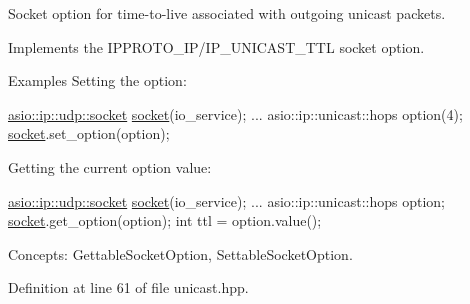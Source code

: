 Socket option for time-\/to-\/live associated with outgoing unicast packets. 

Implements the I\+P\+P\+R\+O\+T\+O\+\_\+\+I\+P/\+I\+P\+\_\+\+U\+N\+I\+C\+A\+S\+T\+\_\+\+T\+T\+L socket option.

\begin{DoxyParagraph}{Examples}
Setting the option\+: 
\begin{DoxyCode}
\hyperlink{classasio_1_1basic__datagram__socket}{asio::ip::udp::socket} \hyperlink{namespacewebsocketpp_1_1transport_1_1asio_1_1socket_1_1error_a828ddaa5ed63a761e1b557465a35f05aa0c31b356014843e1d09514e794a539a7}{socket}(io\_service); 
...
asio::ip::unicast::hops option(4);
\hyperlink{namespacewebsocketpp_1_1transport_1_1asio_1_1socket_1_1error_a828ddaa5ed63a761e1b557465a35f05aa0c31b356014843e1d09514e794a539a7}{socket}.set\_option(option);
\end{DoxyCode}

\end{DoxyParagraph}
\begin{DoxyParagraph}{}
Getting the current option value\+: 
\begin{DoxyCode}
\hyperlink{classasio_1_1basic__datagram__socket}{asio::ip::udp::socket} \hyperlink{namespacewebsocketpp_1_1transport_1_1asio_1_1socket_1_1error_a828ddaa5ed63a761e1b557465a35f05aa0c31b356014843e1d09514e794a539a7}{socket}(io\_service); 
...
asio::ip::unicast::hops option;
\hyperlink{namespacewebsocketpp_1_1transport_1_1asio_1_1socket_1_1error_a828ddaa5ed63a761e1b557465a35f05aa0c31b356014843e1d09514e794a539a7}{socket}.get\_option(option);
\textcolor{keywordtype}{int} ttl = option.value();
\end{DoxyCode}

\end{DoxyParagraph}
\begin{DoxyParagraph}{Concepts\+:}
Gettable\+Socket\+Option, Settable\+Socket\+Option. 
\end{DoxyParagraph}


Definition at line 61 of file unicast.\+hpp.

